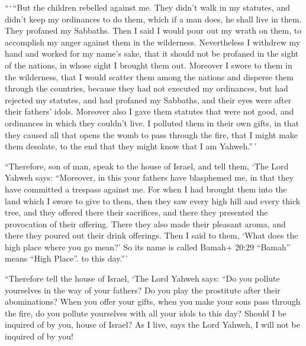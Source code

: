  ```\,``But the children rebelled against me. They didn't
walk in my statutes, and didn't keep my ordinances to do them, which if
a man does, he shall live in them. They profaned my Sabbaths. Then I
said I would pour out my wrath on them, to accomplish my anger against
them in the wilderness.  Nevertheless I withdrew my hand
and worked for my name's sake, that it should not be profaned in the
sight of the nations, in whose sight I brought them out. 
Moreover I swore to them in the wilderness, that I would scatter them
among the nations and disperse them through the countries, 
because they had not executed my ordinances, but had rejected my
statutes, and had profaned my Sabbaths, and their eyes were after their
fathers' idols.  Moreover also I gave them statutes that
were not good, and ordinances in which they couldn't live. 
I polluted them in their own gifts, in that they caused all that opens
the womb to pass through the fire, that I might make them desolate, to
the end that they might know that I am Yahweh.''\,'

 ``Therefore, son of man, speak to the house of Israel, and
tell them, `The Lord Yahweh says: ``Moreover, in this your fathers have
blasphemed me, in that they have committed a trespass against me.
 For when I had brought them into the land which I swore to
give to them, then they saw every high hill and every thick tree, and
they offered there their sacrifices, and there they presented the
provocation of their offering. There they also made their pleasant
aroma, and there they poured out their drink offerings. 
Then I said to them, `What does the high place where you go mean?' So
its name is called Bamah+ 20:29 ``Bamah'' means ``High Place''. to this
day.'''

 ``Therefore tell the house of Israel, `The Lord Yahweh
says: ``Do you pollute yourselves in the way of your fathers? Do you
play the prostitute after their abominations?  When you
offer your gifts, when you make your sons pass through the fire, do you
pollute yourselves with all your idols to this day? Should I be inquired
of by you, house of Israel? As I live, says the Lord Yahweh, I will not
be inquired of by you!

